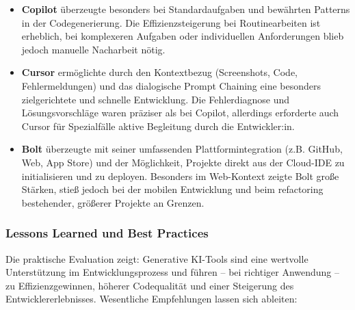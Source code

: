 \begin{itemize}
    \item \textbf{Copilot} überzeugte besonders bei Standardaufgaben und bewährten Patterns in der Codegenerierung. Die Effizienzsteigerung bei Routinearbeiten ist erheblich, bei komplexeren Aufgaben oder individuellen Anforderungen blieb jedoch manuelle Nacharbeit nötig.
    \item \textbf{Cursor} ermöglichte durch den Kontextbezug (Screenshots, Code, Fehlermeldungen) und das dialogische Prompt Chaining eine besonders zielgerichtete und schnelle Entwicklung. Die Fehlerdiagnose und Lösungsvorschläge waren präziser als bei Copilot, allerdings erforderte auch Cursor für Spezialfälle aktive Begleitung durch die Entwickler:in.
    \item \textbf{Bolt} überzeugte mit seiner umfassenden Plattformintegration (z.B. GitHub, Web, App Store) und der Möglichkeit, Projekte direkt aus der Cloud-IDE zu initialisieren und zu deployen. Besonders im Web-Kontext zeigte Bolt große Stärken, stieß jedoch bei der mobilen Entwicklung und beim refactoring bestehender, größerer Projekte an Grenzen.
\end{itemize}

\subsubsection{Lessons Learned und Best Practices}

Die praktische Evaluation zeigt: Generative KI-Tools sind eine wertvolle
Unterstützung im Entwicklungsprozess und führen – bei richtiger Anwendung – zu
Effizienzgewinnen, höherer Codequalität und einer Steigerung des
Entwicklererlebnisses. Wesentliche Empfehlungen lassen sich ableiten:

